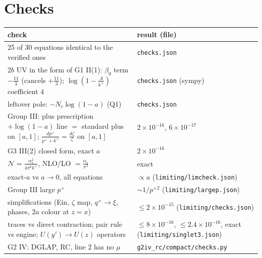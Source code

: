 \section{Checks}\label{sec:checks}
\begin{center}\small
\begin{tabular}{@{}p{}p{}@{}}\toprule
check & result (file)\\\midrule
25 of 30 equations identical to the verified ones & \texttt{checks.json}\\
$2b$ UV in the form of G1 II(1): $\beta_0$ term $-\frac{11}{3}$ (cancels $+\frac{11}{3}$); $\log(1-\frac\Lambda{k^+})$ coefficient $4$ & \texttt{checks.json} (sympy)\\
leftover pole: $-N_c\log(1-a)$ (Q1) & \texttt{checks.json}\\
Group III: plus prescription $+\log(1-a)$ line $=$ standard plus on $[a,1]$; $\frac{dp^+}{p^++k^+}=\frac{d\zeta}\zeta$ on $[a,1]$ & $2\times10^{-16}$, $6\times10^{-17}$\\
G3 III(2) closed form, exact $a$ & $2\times10^{-16}$\\
$\mathcal N=\frac{\alpha_s^2}{4\pi^6k^+}$, NLO/LO $=\frac{\alpha_s}{\pi^2}$ & exact\\
exact-$a$ vs $a\to0$, all equations & $\propto a$ (\texttt{limiting/limcheck.json})\\
Group III large $p^+$ & $\sim1/p^{+2}$ (\texttt{limiting/largep.json})\\
simplifications (Ein, $\zeta$ map, $q^+\to\xi$, phases, $2a$ colour at $z=x$) & $\le2\times10^{-15}$ (\texttt{limiting/checks.json})\\
traces vs direct contraction; pair rule vs engine; $U(y')\to U(z)$ operators & $\le8\times10^{-16}$, $\le2.4\times10^{-16}$, exact (\texttt{limiting/singlet3.json})\\
G2 IV: DGLAP, RC, line 2 has no $\mu$ & \texttt{g2iv\_rc/compact/checks.py}\\\bottomrule
\end{tabular}
\end{center}

